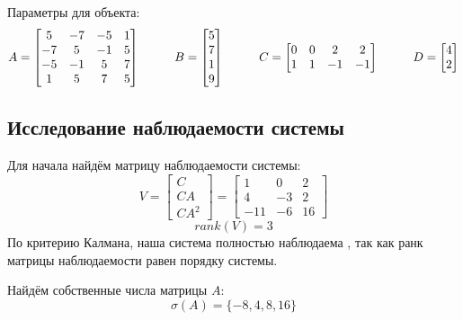 Параметры для объекта:
$$
  A = \begin{bmatrix}
    5  &  -7   & -5  &   1 \\
   -7   &  5  &  -1   &  5 \\
   -5  &  -1  &   5   &  7 \\
    1  &   5  &   7   &  5

  \end{bmatrix} \tab
  B = \begin{bmatrix}
    5\\7\\1\\9
  \end{bmatrix} \tab
  C = \begin{bmatrix}
    0 & 0 & 2 & 2\\
    1 & 1 & -1 & -1
  \end{bmatrix} \tab
  D = \begin{bmatrix}
    4\\2
  \end{bmatrix} 
$$



\subsection{Исследование наблюдаемости системы}
Для начала найдём матрицу наблюдаемости системы:
$$
V = \begin{bmatrix}
    C \\ CA \\ CA^2
\end{bmatrix} = \begin{bmatrix}
                1   &	0	&  2 \\
                4   &   -3  &  2 \\
                -11  &    -6  &  16
            \end{bmatrix}
$$
$$
  rank(V) = 3
$$
По критерию Калмана, наша система полностью наблюдаема , так как ранк матрицы наблюдаемости равен порядку системы.

Найдём собственные числа матрицы $A$:
$$
    \sigma(A) = \{-8, 4, 8, 16\}
$$
